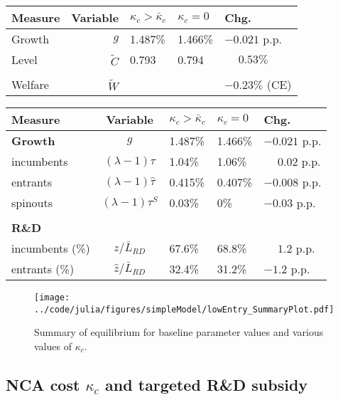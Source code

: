 \documentclass[11pt,english]{article}
\theoremstyle{definition}
\begin{document}
\begin{table}
	\centering
	\label{reducing_kappa_c_table_lowEntry}
	\begin{tabular}{lrlll}
		\toprule \toprule
		Measure & Variable & $\kappa_c > \bar{\kappa}_c$ & $\kappa_c = 0$ & Chg. \tabularnewline
		\midrule
		Growth & $g$ & 1.487\% & 1.466\% & $-0.021$ p.p. \tabularnewline
		Level & $\tilde{C}$  & 0.793 &  0.794 & $\phantom{-}0.53\%$ \tabularnewline 
		\tabularnewline
		Welfare & $\tilde{W}$  &  & & $-0.23\%$ (CE)  \tabularnewline
		\bottomrule
	\end{tabular}
\end{table}

\begin{table}[]
	\centering
	\label{reducing_kappa_c_decomposition_table_lowEntry}
	\begin{tabular}{lclll}
		\toprule \toprule
		Measure & Variable & $\kappa_c > \bar{\kappa}_c$ & $\kappa_c = 0$ & Chg. \tabularnewline
		\midrule
		\textbf{Growth} & $g$ & 1.487\% & 1.466\% & $-0.021$ p.p.\tabularnewline
		\multicolumn{1}{l}{\quad incumbents} & $(\lambda -1) \tau$  & 1.04\% & 1.06\% & $\phantom{-}0.02$ p.p. \tabularnewline
		\multicolumn{1}{l}{\quad entrants} & $(\lambda -1) \hat{\tau}$ & 0.415\% & 0.407\% & $-0.008$ p.p. \tabularnewline
		\multicolumn{1}{l}{\quad spinouts} & $(\lambda -1) \tau^S$ & 0.03\% & 0\% & $-0.03$ p.p. \tabularnewline
		\tabularnewline
		\textbf{R\&D} & & & & 
		\tabularnewline
		\multicolumn{1}{l}{\quad incumbents (\%)}  & $z / \bar{L}_{RD}$ & 67.6\% & 68.8\% & $\phantom{-} 1.2$ p.p. \tabularnewline 
		
		\multicolumn{1}{l}{\quad entrants (\%)}  & $\hat{z} / \bar{L}_{RD}$ & 32.4\% & 31.2\% & $-1.2$ p.p. \tabularnewline
		\bottomrule
	\end{tabular}
\end{table}


\begin{figure}[]
	\centering
	\texttt{[image: ../code/julia/figures/simpleModel/lowEntry\_SummaryPlot.pdf]}
	\caption{Summary of equilibrium for baseline parameter values and various values of $\kappa_c$.}
	\label{calibration_lowEntry_summaryPlot}
\end{figure}


\newpage 
\subsection{NCA cost $\kappa_c$ and targeted R\&D subsidy}\label{appendix:policyanalysis:allpolicies}
\end{document}
